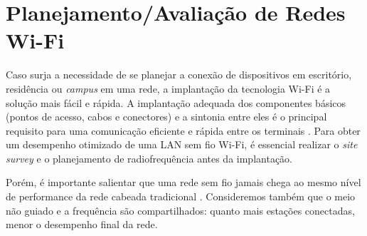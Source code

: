 \begin{table}[H]
\end{table}

\section{Planejamento/Avaliação de Redes Wi-Fi}
\label{sec:alanejamento-avaliação-de-redes-wifi}

Caso surja a necessidade de se planejar a conexão de dispositivos em escritório, residência ou \textit{campus} em uma rede, a implantação da tecnologia Wi-Fi é a solução mais fácil e rápida. A implantação adequada dos componentes básicos (pontos de acesso, cabos e conectores) e a sintonia entre eles é o principal requisito para uma comunicação eficiente e rápida entre os terminais \cite{kar2018ieee}. Para obter um desempenho otimizado de uma LAN sem fio Wi-Fi, é essencial realizar o \textit{site survey} e o planejamento de radiofrequência antes da implantação.

Porém, é importante salientar que uma rede sem fio jamais chega ao mesmo nível de performance da rede cabeada tradicional \cite{moraes2010}. Consideremos também que o meio não guiado e a frequência são compartilhados: quanto mais estações conectadas, menor o desempenho final da rede.

